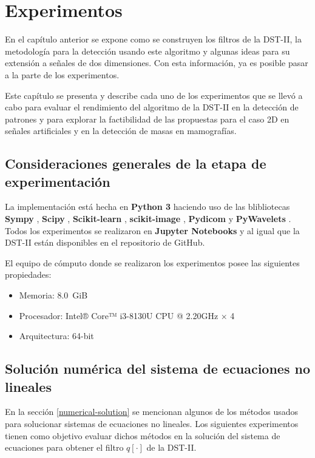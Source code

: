 \chapter{Experimentos}\label{chapter:implementation}


En el capítulo anterior se expone  como se construyen los filtros de la DST-II, la metodología para
la detección usando este algoritmo y algunas ideas para su extensión a señales de dos dimensiones. Con esta información,
ya es posible pasar a la parte de los experimentos. 

Este capítulo se presenta y describe cada uno de los experimentos que se llevó a cabo para evaluar el rendimiento 
del algoritmo de la DST-II en la detección de patrones y para explorar la factibilidad de las propuestas
para el caso 2D en señales artificiales y en la detección de masas en mamografías.

\section{Consideraciones generales de la etapa de experimentación}

La implementación está hecha en \textbf{Python 3} \cite{python3} haciendo uso de las blibliotecas \textbf{Sympy} \cite{10.7717/peerj-cs.103}, 
\textbf{Scipy} \cite{2020SciPy-NMeth}, \textbf{Scikit-learn} \cite{sklearn_api}, \textbf{scikit-image} \cite{van2014scikit},
\textbf{Pydicom} \cite{darcy_mason_2020_4313150}
y \textbf{PyWavelets} \cite{Lee2019}. Todos los experimentos se 
realizaron en \textbf{Jupyter Notebooks} \cite{Kluyver2016jupyter} y al igual que la DST-II están disponibles en el repositorio de
GitHub.

El equipo de cómputo donde se realizaron los experimentos posee las siguientes propiedades:

\begin{itemize}
	\item Memoria: 8.0 GiB
	\item Procesador: Intel® Core™ i3-8130U CPU @ 2.20GHz × 4
	\item Arquitectura: 64-bit
\end{itemize}


\section{Solución numérica del sistema de ecuaciones no lineales}

En la sección \ref{numerical-solution} se mencionan algunos de los métodos usados para solucionar sistemas de 
ecuaciones no lineales. Los siguientes experimentos tienen como objetivo evaluar dichos métodos en la solución
del sistema de ecuaciones para obtener el filtro $q[\cdot]$ de la DST-II.

